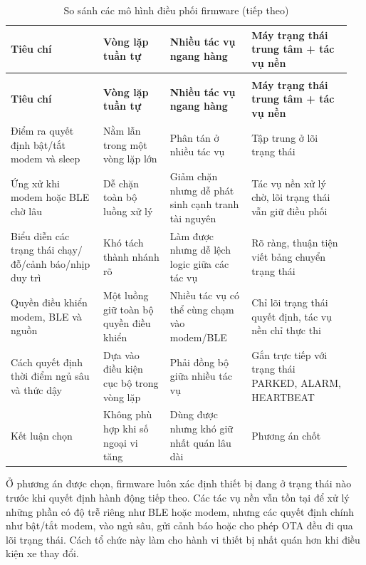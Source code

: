 \documentclass[a4paper]{extarticle}
\newcommand{\thesisterm}[1]{{\rmfamily #1}}
\newcommand{\thesissettableid}[2]{%
  \renewcommand{\thetable}{#1}%
  \renewcommand{\theHtable}{#2}%
}
\begin{document}
{\thesissettableid{3.16}{condensed-bang-3-16-so-sanh-cac-mo-hinh-dieu-phoi-firmware}
\def\LTcaptype{table}
\begin{longtable}{|L{0.258\linewidth}|L{0.188\linewidth}|L{0.227\linewidth}|L{0.278\linewidth}|}
\caption{So sánh các mô hình điều phối firmware}\label{tab:condensed-bang-3-16-so-sanh-cac-mo-hinh-dieu-phoi-firmware}\\
\hline
\textbf{Tiêu chí} & \textbf{Vòng lặp tuần tự} & \textbf{Nhiều tác vụ ngang hàng} & \textbf{Máy trạng thái trung tâm + tác vụ nền} \\
\hline
\endfirsthead
\caption[]{So sánh các mô hình điều phối firmware (tiếp theo)}\\
\hline
\textbf{Tiêu chí} & \textbf{Vòng lặp tuần tự} & \textbf{Nhiều tác vụ ngang hàng} & \textbf{Máy trạng thái trung tâm + tác vụ nền} \\
\hline
\endhead
\endfoot
\endlastfoot
Điểm ra quyết định bật/tắt modem và sleep & Nằm lẫn trong một vòng lặp lớn & Phân tán ở nhiều tác vụ & Tập trung ở lõi trạng thái \\\hline
Ứng xử khi modem hoặc BLE chờ lâu & Dễ chặn toàn bộ luồng xử lý & Giảm chặn nhưng dễ phát sinh cạnh tranh tài nguyên & Tác vụ nền xử lý chờ, lõi trạng thái vẫn giữ điều phối \\\hline
Biểu diễn các trạng thái chạy/đỗ/cảnh báo/nhịp duy trì & Khó tách thành nhánh rõ & Làm được nhưng dễ lệch logic giữa các tác vụ & Rõ ràng, thuận tiện viết bảng chuyển trạng thái \\\hline
Quyền điều khiển modem, BLE và nguồn & Một luồng giữ toàn bộ quyền điều khiển & Nhiều tác vụ có thể cùng chạm vào modem/BLE & Chỉ lõi trạng thái quyết định, tác vụ nền chỉ thực thi \\\hline
Cách quyết định thời điểm ngủ sâu và thức dậy & Dựa vào điều kiện cục bộ trong vòng lặp & Phải đồng bộ giữa nhiều tác vụ & Gắn trực tiếp với trạng thái \thesisterm{PARKED}, \thesisterm{ALARM}, \thesisterm{HEARTBEAT} \\\hline
Kết luận chọn & Không phù hợp khi số ngoại vi tăng & Dùng được nhưng khó giữ nhất quán lâu dài & Phương án chốt \\\hline
\end{longtable}
}

Ở phương án được chọn, firmware luôn xác định thiết bị đang ở trạng thái nào
trước khi quyết định hành động tiếp theo. Các tác vụ nền vẫn tồn tại để xử lý
những phần có độ trễ riêng như BLE hoặc modem, nhưng các quyết định chính như
bật/tắt modem, vào ngủ sâu, gửi cảnh báo hoặc cho phép OTA đều đi qua lõi trạng
thái. Cách tổ chức này làm cho hành vi thiết bị nhất quán hơn khi điều kiện xe
thay đổi.
\end{document}
